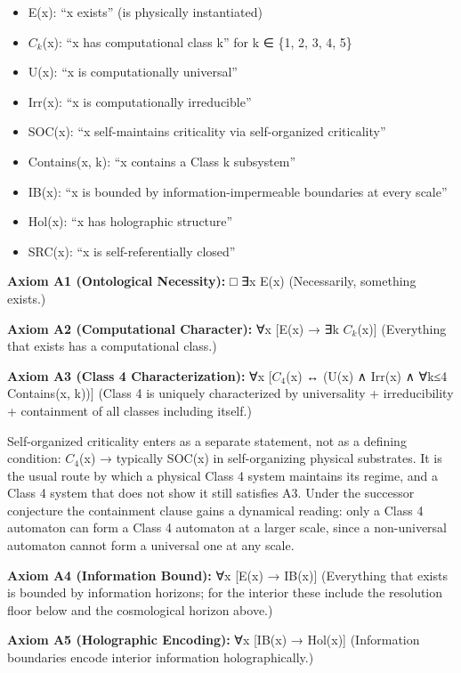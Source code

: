 \documentclass[
]{article}
\providecommand{\tightlist}{%
  \setlength{\itemsep}{0pt}\setlength{\parskip}{0pt}}
\begin{document}
\begin{itemize}
\tightlist
\item
  E(x): ``x exists'' (is physically instantiated)
\item
  \(C_{k}\)(x): ``x has computational class k'' for k ∈ \{1, 2, 3, 4,
  5\}
\item
  U(x): ``x is computationally universal''
\item
  Irr(x): ``x is computationally irreducible''
\item
  SOC(x): ``x self-maintains criticality via self-organized
  criticality''
\item
  Contains(x, k): ``x contains a Class k subsystem''
\item
  IB(x): ``x is bounded by information-impermeable boundaries at every
  scale''
\item
  Hol(x): ``x has holographic structure''
\item
  SRC(x): ``x is self-referentially closed''
\end{itemize}

\textbf{Axiom A1 (Ontological Necessity):} □ ∃x E(x) (Necessarily,
something exists.)

\textbf{Axiom A2 (Computational Character):} ∀x {[}E(x) → ∃k
\(C_{k}\)(x){]} (Everything that exists has a computational class.)

\textbf{Axiom A3 (Class 4 Characterization):} ∀x {[}\(C_{4}\)(x) ↔ (U(x)
∧ Irr(x) ∧ ∀k≤4 Contains(x, k)){]} (Class 4 is uniquely characterized by
universality + irreducibility + containment of all classes including
itself.)

Self-organized criticality enters as a separate statement, not as a
defining condition: \(C_{4}\)(x) → typically SOC(x) in self-organizing
physical substrates. It is the usual route by which a physical Class 4
system maintains its regime, and a Class 4 system that does not show it
still satisfies A3. Under the successor conjecture the containment
clause gains a dynamical reading: only a Class 4 automaton can form a
Class 4 automaton at a larger scale, since a non-universal automaton
cannot form a universal one at any scale.

\textbf{Axiom A4 (Information Bound):} ∀x {[}E(x) → IB(x){]} (Everything
that exists is bounded by information horizons; for the interior these
include the resolution floor below and the cosmological horizon above.)

\textbf{Axiom A5 (Holographic Encoding):} ∀x {[}IB(x) → Hol(x){]}
(Information boundaries encode interior information holographically.)
\end{document}
